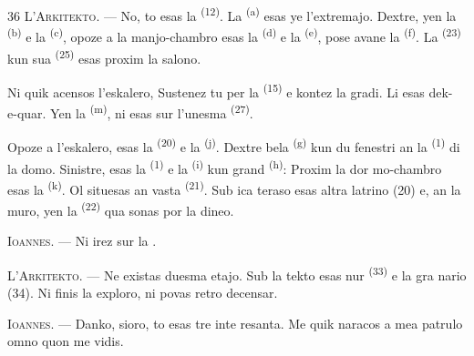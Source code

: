 \begin{VUpage}[38]{36}
\VUblancAlinea
\textsc{L'Arkitekto}. --- No, to esas la  \textsuperscript{(12)}.\nl
La  \textsuperscript{(a)} esas ye l'extremajo. Dextre,\nl
yen la  \textsuperscript{(b)} e la  \textsuperscript{(c)}, opoze\nl
a la manjo-chambro esas la  \textsuperscript{(d)} e la\nl
{} \textsuperscript{(e)}, pose avane la \textsuperscript{(f)}.\nl
La  \textsuperscript{(23)} kun sua  \textsuperscript{(25)}\nl
esas proxim la salono.

\VUblancAlinea
Ni quik acensos l'eskalero, Sustenez tu per\nl
la  \textsuperscript{(15)} e kontez la gradi. Li esas dek-\nl
e-quar. Yen la  \textsuperscript{(m)}, ni esas sur l'unesma\nl
{} \textsuperscript{(27)}.

\VUsaut{3.0mm}
\VUsaut{3.0mm}

\VUblancAlinea
Opoze a l'eskalero, esas la  \textsuperscript{(20)} e la\nl
{} \textsuperscript{(j)}. Dextre bela  \textsuperscript{(g)}\nl
kun du fenestri an la  \textsuperscript{(1)} di la domo.\nl
Sinistre, esas la  \textsuperscript{(1)} e la \nl
{} \textsuperscript{(i)} kun grand  \textsuperscript{(h)}: Proxim la dor\cc
mo-chambro esas la  \textsuperscript{(k)}.\nl
Ol situesas an vasta  \textsuperscript{(21)}. Sub ica teraso\nl
esas altra latrino (20) e, an la muro, yen la\nl
{} \textsuperscript{(22)} qua sonas por la dineo.

\VUblancAlinea
\textsc{Ioannes}. --- Ni irez sur la .

\VUblancAlinea
\textsc{L'Arkitekto}. --- Ne existas duesma etajo.\nl
Sub la tekto esas nur  \textsuperscript{(33)} e la gra\cc
nario (34). Ni finis la exploro, ni povas retro\cc
decensar.

\VUblancAlinea
\textsc{Ioannes}. --- Danko, sioro, to esas tre inte\cc
resanta. Me quik naracos a mea patrulo omno\nl
quon me vidis.

\VUsaut{4.0mm}
\VUfilet{22mm}
\end{VUpage}
